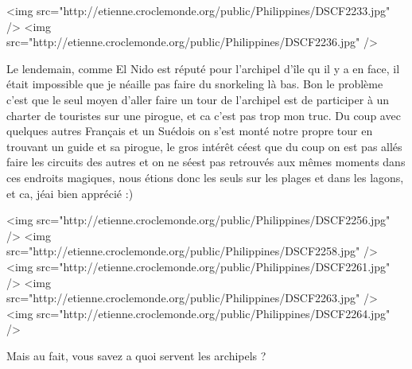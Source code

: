 <img src="http://etienne.croclemonde.org/public/Philippines/DSCF2233.jpg" />
<img src="http://etienne.croclemonde.org/public/Philippines/DSCF2236.jpg" />

Le lendemain, comme El Nido est réputé pour l'archipel d'île qu il y a en face, il était impossible que je néaille pas faire du snorkeling là bas. Bon le problème c'est que le seul moyen d'aller faire un tour de l'archipel est de participer à un charter de touristes sur une pirogue, et ca c'est pas trop mon truc. Du coup avec quelques autres Français et un Suédois on s'est monté notre propre tour en trouvant un guide et sa pirogue, le gros intérêt céest que du coup on est pas allés faire les circuits des autres et on ne séest pas retrouvés aux mêmes moments dans ces endroits magiques, nous étions donc les seuls sur les plages et dans les lagons, et ca, jéai bien apprécié :)

<img src="http://etienne.croclemonde.org/public/Philippines/DSCF2256.jpg" />
<img src="http://etienne.croclemonde.org/public/Philippines/DSCF2258.jpg" />
<img src="http://etienne.croclemonde.org/public/Philippines/DSCF2261.jpg" />
<img src="http://etienne.croclemonde.org/public/Philippines/DSCF2263.jpg" />
<img src="http://etienne.croclemonde.org/public/Philippines/DSCF2264.jpg" />

Mais au fait, vous savez a quoi servent les archipels ?
